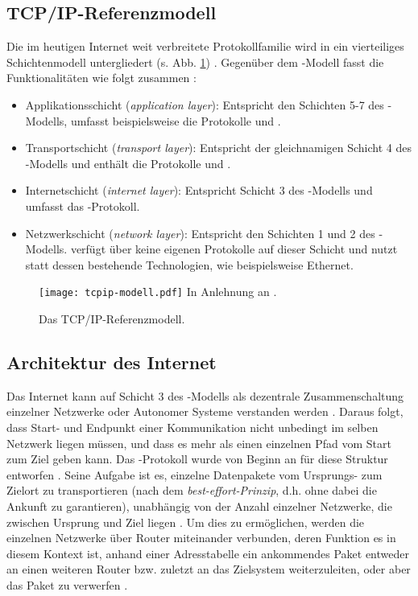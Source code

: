 \subsection{TCP/IP-Referenzmodell}\label{sec:TCP/IP}
Die im heutigen Internet weit verbreitete Protokollfamilie  wird in ein vierteiliges Schichtenmodell untergliedert (s. Abb. \ref{grafik:tcpip-modell}) \autocite[Vgl.][46]{Tanenbaum2010}. Gegenüber dem -Modell fasst \citeauthor{Holtkamp2002} die Funktionalitäten wie folgt zusammen \autocite[Vgl.][12\psq]{Holtkamp2002}:
\begin{itemize}
\item Applikationsschicht (\textit{application layer}): Entspricht den Schichten 5-7 des -Modells, umfasst beispielsweise die Protokolle  und .
\item Transportschicht (\textit{transport layer}): Entspricht der gleichnamigen Schicht 4 des -Modells und enthält die Protokolle  und .
\item Internetschicht (\textit{internet layer}): Entspricht Schicht 3 des -Modells und umfasst das -Protokoll.
\item Netzwerkschicht (\textit{network layer}): Entspricht den Schichten 1 und 2 des -Modells.  verfügt über keine eigenen Protokolle auf dieser Schicht und nutzt statt dessen bestehende Technologien, wie beispielsweise Ethernet.
\end{itemize}

\begin{figure}[tp]
    \centering
    \texttt{[image: tcpip-modell.pdf]}\linebreak
    In Anlehnung an \textcite[46]{Tanenbaum2010}.
    \caption{Das TCP/IP-Referenzmodell.}
    \label{grafik:tcpip-modell}
\end{figure}
\subsection{Architektur des Internet} \label{sec:IP}
Das Internet kann auf Schicht 3 des -Modells als dezentrale Zusammenschaltung einzelner Netzwerke oder Autonomer Systeme verstanden werden \autocite[Vgl.][437]{Tanenbaum2010}. Daraus folgt, dass Start- und Endpunkt einer Kommunikation nicht unbedingt im selben Netzwerk liegen müssen, und dass es mehr als einen einzelnen Pfad vom Start zum Ziel geben kann. Das -Protokoll wurde von Beginn an für diese Struktur entworfen \autocite[Vgl.][438]{Tanenbaum2010}. Seine Aufgabe ist es, einzelne Datenpakete vom Ursprungs- zum Zielort zu transportieren (nach dem \textit{best-effort-Prinzip}, d.h. ohne dabei die Ankunft zu garantieren), unabhängig von der Anzahl einzelner Netzwerke, die zwischen Ursprung und Ziel liegen \autocite[Vgl.][438]{Tanenbaum2010}. Um dies zu ermöglichen, werden die einzelnen Netzwerke über Router miteinander verbunden, deren Funktion es in diesem Kontext ist, anhand einer Adresstabelle ein ankommendes Paket entweder an einen weiteren Router bzw. zuletzt an das Zielsystem weiterzuleiten, oder aber das Paket zu verwerfen \autocite[Vgl.][342]{Tanenbaum2010}.

